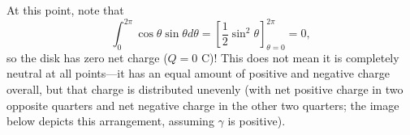 \documentclass[]{article}
\begin{document}
At this point, note that
\[
\int_{0}^{2\pi}\cos\theta\sin\theta d\theta = \left[\frac{1}{2}\sin^{2}\theta\right]_{\theta=0}^{2\pi} = 0,
\]
so the disk has zero net charge ($Q = 0$ C)! This does not mean it is completely neutral at all points---it has an equal amount of positive and negative charge overall, but that charge is distributed unevenly (with net positive charge in two opposite quarters and net negative charge in the other two quarters; the image below depicts this arrangement, assuming $\gamma$ is positive).
\begin{center}
\end{center}
\end{document}
